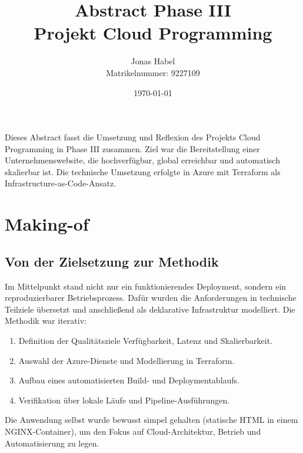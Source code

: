 \documentclass[a4paper,11pt]{article}
\title{Abstract Phase III\\Projekt Cloud Programming}
\author{Jonas Habel\\Matrikelnummer: 9227109}
\date{\today}
\begin{document}
\maketitle

Dieses Abstract fasst die Umsetzung und Reflexion des Projekts \glqq Cloud Programming\grqq{} in Phase III zusammen.
Ziel war die Bereitstellung einer Unternehmenswebsite, die hochverfügbar, global erreichbar und automatisch skalierbar ist.
Die technische Umsetzung erfolgte in Azure mit Terraform als Infrastructure-as-Code-Ansatz.

\section*{Making-of}

\subsection*{Von der Zielsetzung zur Methodik}
Im Mittelpunkt stand nicht nur ein funktionierendes Deployment, sondern ein reproduzierbarer Betriebsprozess.
Dafür wurden die Anforderungen in technische Teilziele übersetzt und anschließend als deklarative Infrastruktur modelliert.
Die Methodik war iterativ:
\begin{enumerate}
  \item Definition der Qualitätsziele Verfügbarkeit, Latenz und Skalierbarkeit.
  \item Auswahl der Azure-Dienste und Modellierung in Terraform.
  \item Aufbau eines automatisierten Build- und Deploymentablaufs.
  \item Verifikation über lokale Läufe und Pipeline-Ausführungen.
\end{enumerate}
Die Anwendung selbst wurde bewusst simpel gehalten (statische HTML in einem NGINX-Container), um den Fokus auf Cloud-Architektur,
Betrieb und Automatisierung zu legen.
\end{document}
